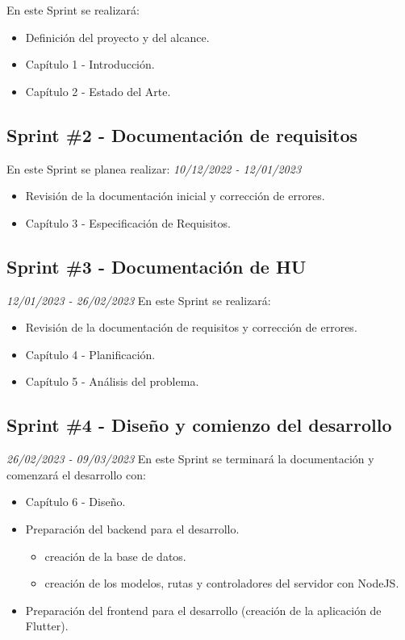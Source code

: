 En este Sprint se realizará:
\begin{itemize}

    \item Definición del proyecto y del alcance.
    \item Capítulo 1 - Introducción.
    \item Capítulo 2 - Estado del Arte.
\end{itemize}
\subsection{Sprint \#2 - Documentación de requisitos}
En este Sprint se planea realizar:
\textit{10/12/2022   -   12/01/2023}
\begin{itemize}
    \item Revisión de la documentación inicial y corrección de errores.
    \item Capítulo 3 - Especificación de Requisitos.
\end{itemize}

\subsection{Sprint \#3 - Documentación de HU}
\textit{12/01/2023   -   26/02/2023}
En este Sprint se realizará:
\begin{itemize}
    \item Revisión de la documentación de requisitos y corrección de errores.
    \item Capítulo 4 - Planificación.
    \item Capítulo 5 - Análisis del problema.
\end{itemize}
\subsection{Sprint \#4 - Diseño y comienzo del desarrollo}
\textit{26/02/2023   -   09/03/2023}
En este Sprint se terminará la documentación y comenzará el desarrollo con:
\begin{itemize}
    \item Capítulo 6 - Diseño.
    \item Preparación del backend para el desarrollo.
    \begin{itemize}
        \item creación de la base de datos.
        \item creación de los modelos, rutas y controladores del servidor con NodeJS.
    \end{itemize}
    \item Preparación del frontend para el desarrollo (creación de la aplicación de Flutter).
\end{itemize}
